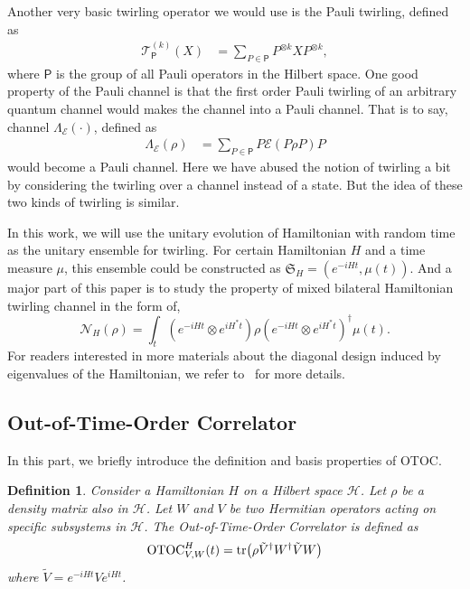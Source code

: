 \documentclass[onecolumn,prx,longbibliography,nofootinbib, superscriptaddress]{revtex4-2}
\newtheorem{definition}{Definition}
\theoremstyle{recap}
\begin{document}
Another very basic twirling operator we would use is the Pauli twirling, defined as
\begin{equation}
\begin{split}
    \mathcal{T}_{\mathsf{P}}^{(k)}(X)&=\sum_{P\in\mathsf{P}}P^{\otimes k}XP^{\otimes k},
\end{split}
\end{equation}
where $\mathsf{P}$ is the group of all Pauli operators in the Hilbert space. One good property of the Pauli channel is that the first order Pauli twirling of an arbitrary quantum channel would makes the channel into a Pauli channel. That is to say, channel $\Lambda_{\mathcal{E}}(\cdot)$, defined as
\begin{equation}
\begin{split}
    \Lambda_{\mathcal{E}}(\rho)&=\sum_{P\in\mathsf{P}}P\mathcal{E}(P\rho P)P
\end{split}
\end{equation}
would become a Pauli channel. Here we have abused the notion of twirling a bit by considering the twirling over a channel instead of a state. But the idea of these two kinds of twirling is similar. 

In this work, we will use the unitary evolution of Hamiltonian with random time as the unitary ensemble for twirling. For certain Hamiltonian $H$ and a time measure $\mu$, this ensemble could be constructed as $\mathfrak{S}_{H}=(e^{-iHt},\mu(t))$. And a major part of this paper is to study the property of mixed bilateral Hamiltonian twirling channel in the form of,
\begin{equation}
    \mathcal{N}_{H}(\rho)=\int_{t}(e^{-iHt}\otimes e^{iH^*t})\rho(e^{-iHt}\otimes e^{iH^*t})^{\dagger}\mu(t).
\end{equation}
For readers interested in more materials about the diagonal design induced by eigenvalues of the Hamiltonian, we refer to~\cite{HamiltonianShadow} for more details. 

\subsection{Out-of-Time-Order Correlator}
In this part, we briefly introduce the definition and basis properties of OTOC. 

\begin{definition}
    Consider a Hamiltonian $H$ on a Hilbert space $\mathcal{H}$. Let $\rho$ be a density matrix also in $\mathcal{H}$. Let $W$ and $V$ be two Hermitian  operators acting on specific subsystems in $\mathcal{H}$. The Out-of-Time-Order Correlator is defined as
    \begin{equation}
        \mathrm{OTOC}_{V,W}^{H}(t)=\tr(\rho \tilde{V}^{\dagger}W^{\dagger}\tilde{V}W)
    \end{equation}
    where $\tilde{V}=e^{-iHt}Ve^{iHt}$.
\end{definition}
\end{document}
